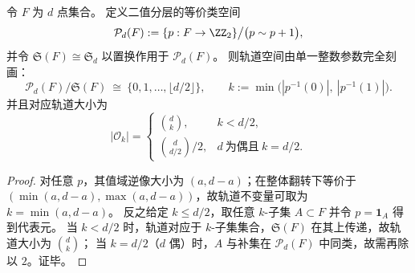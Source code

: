\begin{proposition}[二值分层在置换对称下的轨道分类与精确账本量]\label{prop:bdry-binary-layering-orbit-classification}
令 \(F\) 为 \(d\) 点集合。
定义二值分层的等价类空间
\[
\mathcal P_d(F):=\{p:F\to\ZZ_2\}\big/\bigl(p\sim p+1\bigr),
\]
并令 \(\mathfrak S(F)\cong \mathfrak S_d\) 以置换作用于 \(\mathcal P_d(F)\)。
则轨道空间由单一整数参数完全刻画：
\[
\mathcal P_d(F)\big/\mathfrak S(F)\ \cong\ \{0,1,\dots,\lfloor d/2\rfloor\},
\qquad
k:=\min\bigl(|p^{-1}(0)|,\ |p^{-1}(1)|\bigr).
\]
并且对应轨道大小为
\[
|\mathcal O_k|=
\begin{cases}
\binom{d}{k},& k<d/2,\\[4pt]
\binom{d}{d/2}/2,& d\ \text{为偶且}\ k=d/2.
\end{cases}
\]
\end{proposition}
\begin{proof}
对任意 \(p\)，其值域逆像大小为 \((a,d-a)\)；在整体翻转下等价于 \((\min(a,d-a),\max(a,d-a))\)，故轨道不变量可取为 \(k=\min(a,d-a)\)。
反之给定 \(k\le d/2\)，取任意 \(k\)-子集 \(A\subset F\) 并令 \(p=\mathbf 1_A\) 得到代表元。
当 \(k<d/2\) 时，轨道对应于 \(k\)-子集集合，\(\mathfrak S(F)\) 在其上传递，故轨道大小为 \(\binom{d}{k}\)；
当 \(k=d/2\)（\(d\) 偶）时，\(A\) 与补集在 \(\mathcal P_d(F)\) 中同类，故需再除以 \(2\)。证毕。
\end{proof}

